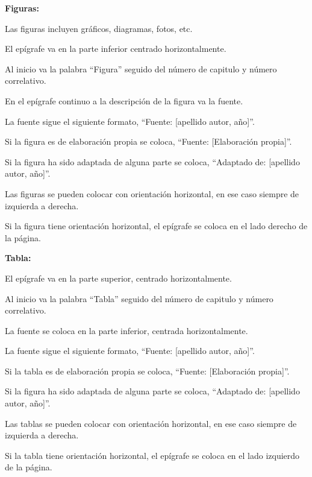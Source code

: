 {{\begin{lista}
    \item\textbf{Figuras:}
    \begin{lista}
        \item Las figuras incluyen gráficos, diagramas, fotos, etc.
        \item El epígrafe va en la parte inferior centrado horizontalmente.
        \item Al inicio va la palabra “Figura” seguido del número de capitulo y número correlativo.
        \item En el epígrafe continuo a la descripción de la figura va la fuente.
        \item La fuente sigue el siguiente formato, “Fuente: [apellido autor, año]”.
        \item Si la figura es de elaboración propia se coloca, “Fuente: [Elaboración propia]”.
        \item Si la figura ha sido adaptada de alguna parte se coloca, “Adaptado de: [apellido autor, año]”.
        \item Las figuras se pueden colocar con orientación horizontal, en ese caso siempre de izquierda a derecha.
        \item Si la figura tiene orientación horizontal, el epígrafe se coloca en el lado derecho de la página.
    \end{lista}

    \item\textbf{Tabla:}
    \begin{lista}
        \item El epígrafe va en la parte superior, centrado horizontalmente.
        \item Al inicio va la palabra “Tabla” seguido del número de capitulo y número correlativo.
        \item La fuente se coloca en la parte inferior, centrada horizontalmente.
        \item La fuente sigue el siguiente formato, “Fuente: [apellido autor, año]”.
        \item Si la tabla es de elaboración propia se coloca, “Fuente: [Elaboración propia]”.
        \item Si la figura ha sido adaptada de alguna parte se coloca, “Adaptado de: [apellido autor, año]”.
        \item Las tablas se pueden colocar con orientación horizontal, en ese caso siempre de izquierda a derecha.
        \item Si la tabla tiene orientación horizontal, el epígrafe se coloca en el lado izquierdo de la página.
    \end{lista}


\end{lista}}}
